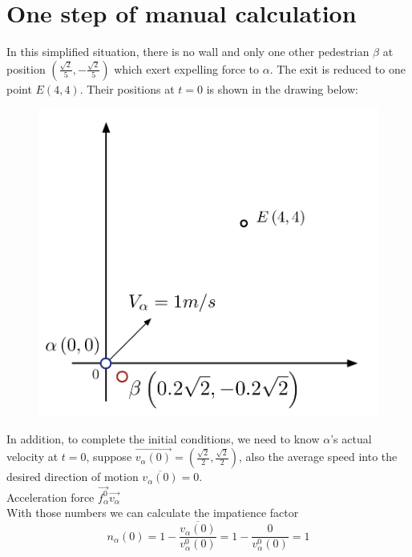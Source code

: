 \section{One step of manual calculation}

In this simplified situation, there is no wall and only one other pedestrian $\beta$ at position $(\frac{\sqrt{2}}{5}, -\frac{\sqrt{2}}{5})$ which exert expelling force to $\alpha$.  The exit is reduced to one point $E(4,4)$.  Their positions at $t=0$ is shown in the drawing below:\\

\begin{figure}
\centering
{\includegraphics[scale=0.45]{Figures/calculation.pdf}} 
\caption{\small{}\label{calc}}
\end{figure}

In addition, to complete the initial conditions, we need to know $\alpha$'s actual velocity at $t=0$, suppose $\overrightarrow{v_{\alpha}(0)}=(\frac{\sqrt{2}}{2}, \frac{\sqrt{2}}{2})$, also the average speed into the desired direction of motion $\overline{v_{\alpha}(0)}=0$.\\

\blacktriangleright Acceleration force $ \overrightarrow{f^{0}_{\alpha}}\overrightarrow{v_{\alpha}} $\\

With those numbers we can calculate the impatience factor 
 \begin{equation}
 n_{\alpha}(0)=1-\frac{\overline{v_{\alpha}(0)}}{v^{0}_{\alpha}(0)}=1-\dfrac{0}{v^{0}_{\alpha}(0)}=1
 \end{equation}

